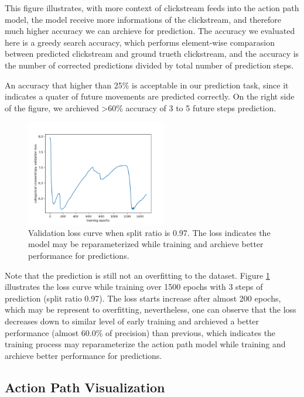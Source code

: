 This figure illustrates, with more context of clickstream
feeds into the action path model, the model receive more informations of the clickstream, 
and therefore much higher accuracy we can archieve for prediction.
The accuracy we evaluated here is a greedy search accuracy, which performs element-wise comparasion
between predicted clickstream and ground trueth clickstream, and the accuracy is the number of
corrected predictions divided by total number of prediction steps.

An accuracy that higher than 25\% is acceptable in our prediction task, since it indicates
a quater of future movements are predicted correctly.
On the right side of the figure, we archieved >60\% accuracy of 3 to 5 future steps prediction.

\begin{figure}[H]
    \centering
    \includegraphics[width=0.55\textwidth]{figures/loss2}
    \caption{Validation loss curve when split ratio is 0.97. The loss indicates
    the model may be reparameterized while training and archieve better performance
    for predictions.}
    \label{fig:loss}
\end{figure}

Note that the prediction is still not an overfitting to the dataset. Figure \ref{fig:loss}
illustrates the loss curve while training over 1500 epochs with 3 steps of prediction (split ratio 0.97).
The loss starts increase after almost 200 epochs, which may be represent to overfitting,
nevertheless, one can observe that the loss decreases down to similar level of early training 
and archieved a better performance (almost 60.0\% of precision) than previous, which indicates
the training process may reparameterize the action path model while training and archieve better performance
for predictions.

\subsection{Action Path Visualization}

